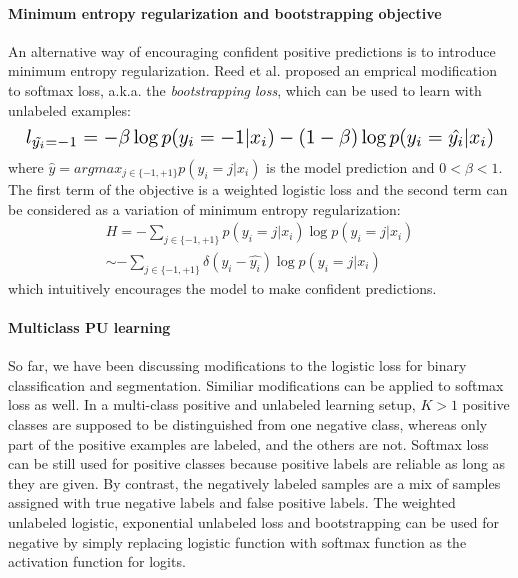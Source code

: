 \paragraph{Minimum entropy regularization and bootstrapping objective}
\noindent
An alternative way of encouraging confident positive predictions is to introduce minimum entropy regularization\cite{grandvalet2005semi}.
Reed et al.\cite{reed2014training} proposed an emprical modification to softmax loss, a.k.a. the \textit{bootstrapping loss}, which can be used to learn with unlabeled examples:
\begin{equation*}
\resizebox{\columnwidth}{!}{
  $l_{\tilde{y_i}=-1} = - \beta \log p(y_i=-1 \vert x_i) - (1-\beta) \log p(y_i=\hat{y_i} \vert x_i)$
}
\end{equation*}
where $\hat{y} = argmax_{j\in\{-1,+1\}}p(y_i=j \vert x_i)$ is the model prediction and $0<\beta<1$.
The first term of the objective is a weighted logistic loss and the second term can be considered as a variation of minimum entropy regularization:
\begin{equation*}
  \begin{aligned}
    H = - \sum_{j\in\{-1,+1\}} p(y_i=j \vert x_i) \log p(y_i=j \vert x_i) \\
    \sim - \sum_{j\in\{-1,+1\}} \delta(y_i - \hat{y_i}) \log p(y_i=j \vert x_i)
  \end{aligned}
\end{equation*}
which intuitively encourages the model to make confident predictions\cite{grandvalet2005semi}.

\paragraph{Multiclass PU learning}
So far, we have been discussing modifications to the logistic loss for binary classification and segmentation.
Similiar modifications can be applied to softmax loss as well.
In a multi-class positive and unlabeled learning setup, $K>1$ positive classes are supposed to be distinguished from one negative class, whereas only part of the positive examples are labeled, and the others are not.
Softmax loss can be still used for positive classes because positive labels are reliable as long as they are given.
By contrast, the negatively labeled samples are a mix of samples assigned with true negative labels and false positive labels.
The weighted unlabeled logistic, exponential unlabeled loss and bootstrapping can be used for negative by simply replacing logistic function with softmax function as the activation function for logits.


